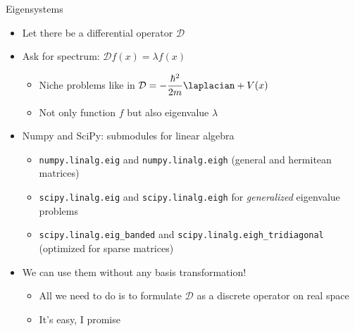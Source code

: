 \begin{frame}{Eigensystems}
%
\begin{itemize}
\item Let there be a differential operator $\mathcal{D}$
\item Ask for spectrum: $\mathcal{D}f(x) = \lambda f(x)$
	\begin{itemize}
	\item Niche problems like in $\mathcal{D} = -\dfrac{\hbar^2}{2m} \laplacian + V(x)$
	\item[\Thus] Not only function $f$ but also eigenvalue $\lambda$
	\end{itemize}
\item Numpy and SciPy: submodules for linear algebra
	\begin{itemize}
	\item \texttt{numpy.linalg.eig} and \texttt{numpy.linalg.eigh} (general and hermitean matrices)
	\item \texttt{scipy.linalg.eig} and \texttt{scipy.linalg.eigh} for \emph{generalized} eigenvalue problems
	\item \texttt{scipy.linalg.eig\_banded} and \texttt{scipy.linalg.eigh\_tridiagonal} (optimized for sparse matrices)
	\end{itemize}
\item We can use them without any basis transformation!
	\begin{itemize}
	\item All we need to do is to formulate $\mathcal{D}$ as a discrete operator on real space
	\item It's easy, I promise
	\end{itemize}
\end{itemize}
%
\end{frame}


